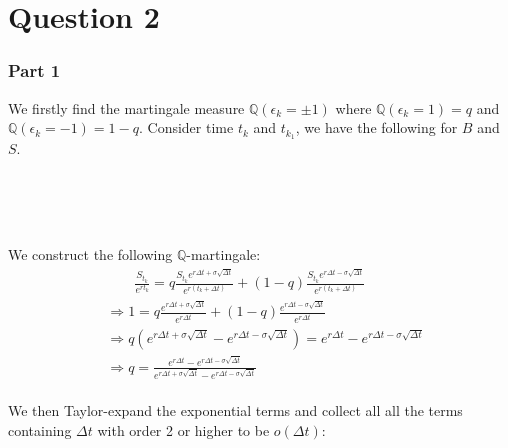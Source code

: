\documentclass[12pt, letterpaper]{article}
\begin{document}
\part*{Question 2}
\section*{Part 1}
We firstly find the martingale measure $\mathbb{Q}(\epsilon_k = \pm 1)$ where $\mathbb{Q}(\epsilon_k =1) = q$ and $\mathbb{Q}(\epsilon_k =-1) = 1-q$. Consider 
time $t_k$ and $t_{k_1}$, we have the following for $B$ and $S$. \\ \\ 
\\
\\
We construct the following $\mathbb{Q}$-martingale:
\begin{align*}
&\qquad \frac{S_{t_k}}{e^{rt_k}} = q\frac{S_{t_k}e^{r\Delta t + \sigma \sqrt{\Delta t}}}{e^{r(t_k+\Delta t)}} + (1-q)\frac{S_{t_k}e^{r\Delta t - \sigma \sqrt{\Delta t}}}{e^{r(t_k+\Delta t)}}\\
&\Rightarrow 1 = q\frac{e^{r\Delta t + \sigma \sqrt{\Delta t}}}{e^{r\Delta t}} + (1-q) \frac{e^{r\Delta t - \sigma \sqrt{\Delta t}}}{e^{r\Delta t}} \\
&\Rightarrow q(e^{r\Delta t + \sigma \sqrt{\Delta t}} - e^{r\Delta t - \sigma \sqrt{\Delta t}}) = e^{r\Delta t} - e^{r\Delta t - \sigma \sqrt{\Delta t}} \\
&\Rightarrow q = \frac{e^{r\Delta t} - e^{r\Delta t - \sigma \sqrt{\Delta t}}}{e^{r\Delta t + \sigma \sqrt{\Delta t}} - e^{r\Delta t - \sigma \sqrt{\Delta t}}}
\end{align*} 
\\
We then Taylor-expand the exponential terms and collect all all the terms containing $\Delta t$ with order 2 or higher to be $o(\Delta t)$:
\end{document}
